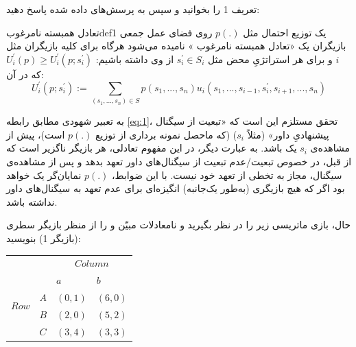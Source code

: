\documentclass[12pt]{exam}
\theoremstyle{plain}
\theoremstyle{definition}
\theoremstyle{remark}
\begin{document}
\begin{questions}
\question
تعریف 1
را بخوانید و سپس به پرسش‌های داده شده پاسخ دهید:

\begin{definition}{تعادل همبسته نامرغوب}{def1}
     یک توزیع احتمال مثل
    $p(.)$
    روی فضای عمل جمعی بازیگران یک «تعادل همبسته نامرغوب 
    »
        نامیده می‌شود هرگاه برای کلیه بازیگران مثل $i$ و برای هر استراتژیِ محض مثل
        $ s^{\prime}_{i} \in S_i $
        از وی داشته باشیم:
        $ U^{\prime}_i(p) \geq  U^{\prime}_i(p; s^{\prime}_{i}) $
        که در آن:
        \begin{equation}\label{eq:1}
               U^{\prime}_i(p; s^{\prime}_{i}) := \sum_{(s_1, ..., s_n) \in S} p(s_1, ..., s_n) u_i(s_1, ..., s_{i-1},  s^{\prime}_i, s_{i+1}, ..., s_n)
        \end{equation}
        
        به تعبیر شهودی مطابق رابطه 
        \ref{eq:1}،
         تحقق
        مستلزم این است که «تبعیت از سیگنال پیشنهادیِ داور» (مثلاً $ s_i$) (که ماحصل نمونه برداری از توزیع
        $ p(.)$ 
        است)، پیش از مشاهده‌ی $ s_i $ یک
         باشد. به عبارت دیگر، در این مفهوم تعادلی، هر بازیگر ناگزیر است که از قبل، در خصوص تبعیت/عدم تبعیت از سیگنال‌های داور تعهد بدهد و پس از مشاهده‌ی سیگنال، مجاز به تخطی از تعهد خود نیست. با این ضوابط، 
          $ p(.)$ 
         نمایان‌گر یک 
          خواهد بود اگر که هیچ بازیگری (به‌طور یک‌جانبه) انگیزه‌ای برای عدم تعهد به سیگنال‌های داور نداشته باشد.    
\end{definition}
حال، بازی ماتریسی زیر را در نظر بگیرید و نامعادلات مبیّن
 و
 را از منظر بازیگر سطری (بازیگر 1) بنویسید:
 
 { \centering
     \begin{LTR}
         \begin{tabular}{l|l|l|l}
             \multicolumn{2}{l}{\multirow{2}{*}{}}                                               & \multicolumn{2}{c}{$Column$}                              \\ \cline{3-4} 
             \multicolumn{2}{l}{}                                                                & \multicolumn{1}{|l|}{$a$}    & \multicolumn{1}{l|}{$b$}    \\ \cline{2-4} 
             \multicolumn{1}{c|}{\multirow{2}{*}{$Row$}} & \multicolumn{1}{l|}{$A$} & \multicolumn{1}{l|}{$(0,1)$} & \multicolumn{1}{l|}{$(6,0)$} \\ \cline{2-4} 
             \multicolumn{1}{c|}{}                                     & \multicolumn{1}{l|}{$B$} & \multicolumn{1}{l|}{$(2,0)$} & \multicolumn{1}{l|}{$(5,2)$} \\ \cline{2-4} 
              \multicolumn{1}{c|}{}                                     & \multicolumn{1}{l|}{$C$} & \multicolumn{1}{l|}{$(3,4)$} & \multicolumn{1}{l|}{$(3,3)$} \\ \cline{2-4} 
         \end{tabular}
     \end{LTR}
 }


\end{questions}
\end{document}
